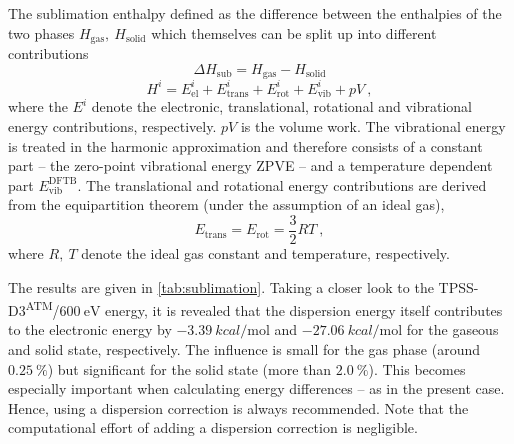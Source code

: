 \documentclass[a4paper,12pt]{scrartcl}
\begin{document}
The sublimation enthalpy defined as the difference between the enthalpies of the two phases $ H_\mathrm{gas},~H_\mathrm{solid} $ which themselves can be split up into different contributions
%
\begin{equation}
	\Delta H_\mathrm{sub} = H_\mathrm{gas} - H_\mathrm{solid}
\end{equation}
%
\begin{equation}
	H^i = E_\mathrm{el}^i + E_\mathrm{trans}^i + E_\mathrm{rot}^i + E_\mathrm{vib}^i + pV~,
\end{equation}
%
where the $ E^i $ denote the electronic, translational, rotational and vibrational energy contributions, respectively. $ pV $ is the volume work. The vibrational energy is treated in the harmonic approximation and therefore consists of a constant part -- the zero-point vibrational energy ZPVE -- and a temperature dependent part $ E_\mathrm{vib}^\mathrm{DFTB}$. The translational and rotational energy contributions are derived from the equipartition theorem (under the assumption of an ideal gas),
%
\begin{equation}
	E_\mathrm{trans} = E_\mathrm{rot} = \frac{3}{2}RT~,
\end{equation}
%
where $ R,~T $ denote the ideal gas constant and temperature, respectively.

The results are given in \autoref{tab:sublimation}. Taking a closer look to the TPSS-D3\textsuperscript{ATM}/$ \SI[]{600}{\electronvolt} $ energy, it is revealed that the dispersion energy itself contributes to the electronic energy by $ \SI{-3.39}{kcal\per\mole} $ and $ \SI[]{-27.06}{kcal\per\mole} $ for the gaseous and solid state, respectively. The influence is small for the gas phase (around $ \SI[]{0.25}{\percent} $) but significant for the solid state (more than $ \SI[]{2.0}{\percent} $). This becomes especially important when calculating energy differences -- as in the present case. Hence, using a dispersion correction is always recommended. Note that the computational effort of adding a dispersion correction is negligible.
\end{document}
